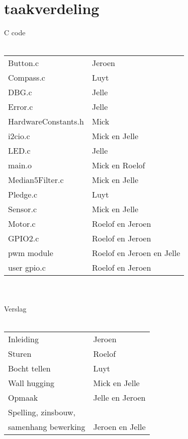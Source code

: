 \documentclass{report}
\begin{document}
\section{taakverdeling}
C code\\\\
\begin{tabular}{ll}
Button.c & Jeroen \\
Compass.c & Luyt\\
DBG.c & Jelle\\
Error.c & Jelle\\
HardwareConstants.h & Mick\\
i2cio.c & Mick en Jelle\\
LED.c & Jelle\\
main.o & Mick en Roelof\\
Median5Filter.c & Mick en Jelle\\
Pledge.c & Luyt\\
Sensor.c & Mick en Jelle\\
Motor.c & Roelof en Jeroen\\
GPIO2.c & Roelof en Jeroen\\
pwm module & Roelof en Jeroen en Jelle\\
user gpio.c & Roelof en Jeroen\\
\end{tabular}
\\\\Verslag\\\\
\begin{tabular}{ll}
Inleiding & Jeroen\\
Sturen & Roelof\\
Bocht tellen & Luyt\\
Wall hugging & Mick en Jelle\\
Opmaak & Jelle en Jeroen\\
Spelling, zinsbouw, \\ samenhang bewerking & Jeroen en Jelle\\
\end{tabular}
\end{document}
